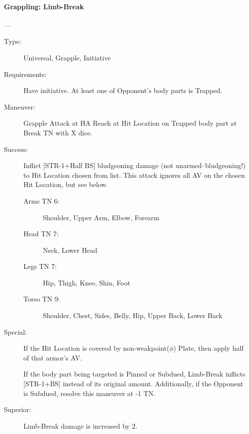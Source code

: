 \paragraph{Grappling: Limb-Break \large} \label{man:grappling-limb-break}
---\quad {\large [X]}
\vspace{-10pt} \begin{description}
\item [Type:] Universal, Grapple, Initiative
\item [Requirements:] Have initiative. At least one of Opponent's body parts is Trapped.
\item [Maneuver:] Grapple Attack at HA Reach at Hit Location on Trapped body
  part at Break TN with X dice. 
\item [Success:] Inflict [STR-1+Half BS] bludgeoning damage (not
  unarmed--bludgeoning!) to Hit Location chosen from list. This attack ignores
  all AV on the chosen Hit Location, but see below. 
  \begin{description}
  \item [Arms TN 6:] Shoulder, Upper Arm, Elbow, Forearm
  \item [Head TN 7:] Neck, Lower Head
  \item [Legs TN 7:] Hip, Thigh, Knee, Shin, Foot
  \item [Torso TN 9:] Shoulder, Chest, Sides, Belly, Hip, Upper Back, Lower Back
  \end{description}
\item [Special:] 
 If the Hit Location is covered by non-weakpoint($\phi$) Plate, then apply half
 of that armor’s AV.  

If the body part being targeted is Pinned or Subdued, Limb-Break inflicts
[STR-1+BS] instead of its original amount. Additionally, if the Opponent is
Subdued, resolve this maneuver at -1 TN. 
\item [ Superior: ] Limb-Break damage is increased by 2.
\end{description}

